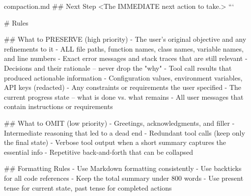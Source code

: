 \begin{prompttemplate}{compaction.md}
## Next Step
<The IMMEDIATE next action to take.>
```

# Rules

## What to PRESERVE (high priority)
- The user's original objective and any refinements to it
- ALL file paths, function names, class names, variable names, and line
  numbers
- Exact error messages and stack traces that are still relevant
- Decisions and their rationale -- never drop the "why"
- Tool call results that produced actionable information
- Configuration values, environment variables, API keys (redacted)
- Any constraints or requirements the user specified
- The current progress state -- what is done vs. what remains
- All user messages that contain instructions or requirements

## What to OMIT (low priority)
- Greetings, acknowledgments, and filler
- Intermediate reasoning that led to a dead end
- Redundant tool calls (keep only the final state)
- Verbose tool output when a short summary captures the essential info
- Repetitive back-and-forth that can be collapsed

## Formatting Rules
- Use Markdown formatting consistently
- Use backticks for all code references
- Keep the total summary under 800 words
- Use present tense for current state, past tense for completed actions
\end{prompttemplate}


